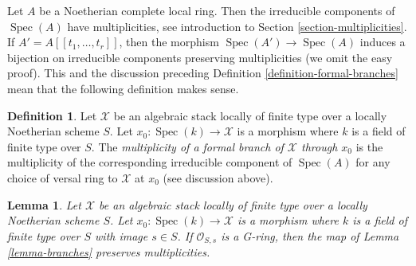 \documentclass{stacks-project}
\theoremstyle{plain}
\newtheorem{lemma}[subsection]{Lemma}
\theoremstyle{definition}
\newtheorem{definition}[subsection]{Definition}
\theoremstyle{remark}
\numberwithin{equation}{subsection}
\def\Spec{\mathop{\mathrm{Spec}}}
\begin{document}
\noindent
Let $A$ be a Noetherian complete local ring. Then the irreducible
components of $\Spec(A)$ have multiplicities, see
introduction to Section \ref{section-multiplicities}.
If $A' = A[[t_1, \ldots, t_r]]$, then the morphism
$\Spec(A') \to \Spec(A)$ induces a bijection on irreducible
components preserving multiplicities (we omit the easy proof).
This and the discussion preceding
Definition \ref{definition-formal-branches}
mean that the following definition makes sense.

\begin{definition}
\label{definition-multiplicity-formal-branches}
Let $\mathcal{X}$ be an algebraic stack locally of finite type
over a locally Noetherian scheme $S$. Let $x_0 : \Spec(k) \to \mathcal{X}$
is a morphism where $k$ is a field of finite type over $S$.
The {\it multiplicity of a formal branch of $\mathcal{X}$ through $x_0$}
is the multiplicity of the corresponding irreducible component of
$\Spec(A)$ for any choice of versal ring to $\mathcal{X}$ at $x_0$
(see discussion above).
\end{definition}

\begin{lemma}
\label{lemma-branches-multiplicity}
Let $\mathcal{X}$ be an algebraic stack locally of finite type
over a locally Noetherian scheme $S$. Let $x_0 : \Spec(k) \to \mathcal{X}$
is a morphism where $k$ is a field of finite type over $S$ with
image $s \in S$. If $\mathcal{O}_{S, s}$ is a G-ring, then
the map of Lemma \ref{lemma-branches} preserves multiplicities.
\end{lemma}
\end{document}
